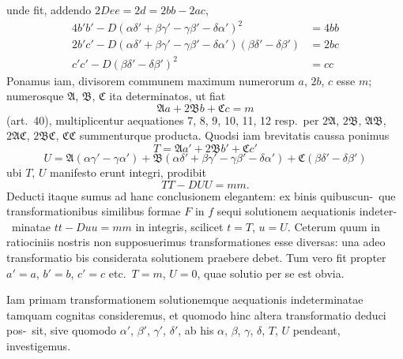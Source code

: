\documentclass[12pt,a4paper]{article}
\theoremstyle{plain}
\theoremstyle{definition}
\theoremstyle{remark}
\begin{document}
unde fit, addendo $2Dee = 2d = 2bb - 2ac$,
\begin{align*}
4b'b' - D(\alpha\delta' + \beta\gamma' - \gamma\beta' - \delta\alpha')^2 &= 4bb \tag{9'} \\
2b'c' - D(\alpha\delta' + \beta\gamma' - \gamma\beta' - \delta\alpha')(\beta\delta' - \delta\beta') &= 2bc \tag{11} \\
c'c' - D(\beta\delta' - \delta\beta')^2 &= cc \tag{12}
\end{align*}
Ponamus iam, divisorem communem maximum numerorum $a$, $2b$, $c$ esse $m$;
numerosque $\mathfrak{A}$, $\mathfrak{B}$, $\mathfrak{C}$ ita determinatos, ut fiat
\[
\mathfrak{A}a + 2\mathfrak{B}b + \mathfrak{C}c = m
\]
(art.~40), multiplicentur aequationes 7, 8, 9, 10, 11, 12 resp.\ per $2\mathfrak{A}$, $2\mathfrak{B}$, $\mathfrak{A}\mathfrak{B}$,
$2\mathfrak{A}\mathfrak{C}$, $2\mathfrak{B}\mathfrak{C}$, $\mathfrak{C}\mathfrak{C}$ summenturque producta. Quodsi iam brevitatis caussa ponimus
\[
T = \mathfrak{A}a' + 2\mathfrak{B}b' + \mathfrak{C}c'
\]
\[
U = \mathfrak{A}(\alpha\gamma' - \gamma\alpha') + \mathfrak{B}(\alpha\delta' + \beta\gamma' - \gamma\beta' - \delta\alpha') + \mathfrak{C}(\beta\delta' - \delta\beta') \tag{13}
\]
ubi $T$, $U$ manifesto erunt integri, prodibit
\[
TT - DUU = mm.
\]
Deducti itaque sumus ad hanc conclusionem elegantem: ex binis quibuscun-\ que transformationibus similibus formae $F$ in $f$ sequi solutionem aequationis indeter-\ minatae $tt - Duu = mm$ in integris, scilicet $t = T$, $u = U$. Ceterum quum in
ratiociniis nostris non supposuerimus transformationes esse diversas: una adeo
transformatio bis considerata solutionem praebere debet. Tum vero fit propter
$a' = a$, $b' = b$, $c' = c$ etc.\ $T = m$, $U = 0$, quae solutio per se est obvia.

Iam primam transformationem solutionemque aequationis indeterminatae
tamquam cognitas consideremus, et quomodo hinc altera transformatio deduci pos-\ sit, sive quomodo $\alpha'$, $\beta'$, $\gamma'$, $\delta'$, ab his $\alpha$, $\beta$, $\gamma$, $\delta$, $T$, $U$ pendeant, investigemus.
\end{document}
